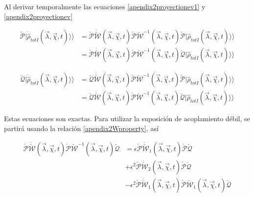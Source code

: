 \begin{appendixs}
Al derivar temporalmente las ecuaciones \ref{apendix2proyectionev1} y \ref{apendix2proyectionev} 

\begin{align*}
    \check{\mathcal{P}}|\dot{\hat{\rho}}_{totI}(\vec{\lambda},\vec{\chi},t) \rangle \rangle & = \check{\mathcal{P}}\dot{\check{\mathcal{W}}}(\vec{\lambda},\vec{\chi},t)\check{\mathcal{P}}\check{\mathcal{W}}^{-1}(\vec{\lambda},\vec{\chi},t)\check{\mathcal{P}}|\hat{\rho}_{totI}(\vec{\lambda},\vec{\chi},t)\rangle \rangle \\
     & = \check{\mathcal{P}}\dot{\check{\mathcal{W}}}(\vec{\lambda},\vec{\chi},t)\check{\mathcal{P}}\check{\mathcal{W}}^{-1}(\vec{\lambda},\vec{\chi},t)\check{\mathcal{Q}}|\hat{\rho}_{totI}(\vec{\lambda},\vec{\chi},t)\rangle \rangle 
\end{align*}

\begin{align*}
    \check{\mathcal{Q}}|\dot{\hat{\rho}}_{totI}(\vec{\lambda},\vec{\chi},t) \rangle \rangle & = \check{\mathcal{Q}}\dot{\check{\mathcal{W}}}(\vec{\lambda},\vec{\chi},t)\check{\mathcal{P}}\check{\mathcal{W}}^{-1}(\vec{\lambda},\vec{\chi},t)\check{\mathcal{P}}|\hat{\rho}_{totI}(\vec{\lambda},\vec{\chi},t)\rangle \rangle \\
     & = \check{\mathcal{Q}}\dot{\check{\mathcal{W}}}(\vec{\lambda},\vec{\chi},t)\check{\mathcal{P}}\check{\mathcal{W}}^{-1}(\vec{\lambda},\vec{\chi},t)\check{\mathcal{Q}}|\hat{\rho}_{totI}(\vec{\lambda},\vec{\chi},t)\rangle \rangle 
\end{align*}

Estas ecuaciones son exactas. Para utilizar la suposición de acoplamiento débil, se partirá usando la relación \ref{apendix2Wproperty}, así

\begin{align*}
    \check{\mathcal{P}}\dot{\check{\mathcal{W}}}(\vec{\lambda},\vec{\chi},t)\check{\mathcal{P}}\check{\mathcal{W}}^{-1}(\vec{\lambda},\vec{\chi},t)\check{\mathcal{Q}} & = \epsilon \check{\mathcal{P}}\dot{\check{\mathcal{W}}}_{1}(\vec{\lambda},\vec{\chi},t) \check{\mathcal{P}}\check{\mathcal{Q}} \\
     & + \epsilon^{2} \check{\mathcal{P}}\dot{\check{\mathcal{W}}}_{2}(\vec{\lambda},\vec{\chi},t) \check{\mathcal{P}}\check{\mathcal{Q}} \\
     & - \epsilon^{2}\check{\mathcal{P}}\dot{\check{\mathcal{W}}}_{1}(\vec{\lambda},\vec{\chi},t)\check{\mathcal{P}} \check{\mathcal{W}}_{1}(\vec{\lambda},\vec{\chi},t)\check{\mathcal{Q}}
\end{align*}


\end{appendixs}
